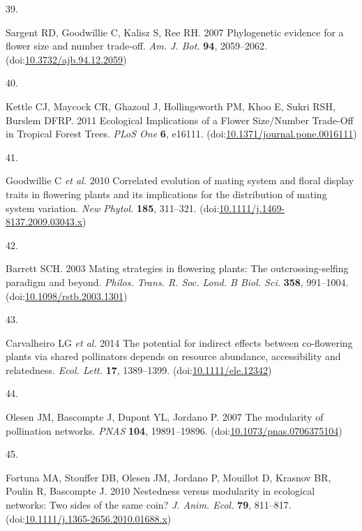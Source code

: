 \documentclass[
  12pt,
  a4paper,
]{article}
\newlength{\cslhangindent}
\newlength{\csllabelwidth}
\newlength{\cslentryspacingunit} %
\newenvironment{CSLReferences}[2] %
 {%
  \setlength{\parindent}{0pt}
  \ifodd #1
  \let\oldpar\par
  \def\par{\hangindent=\cslhangindent\oldpar}
  \fi
  \setlength{\parskip}{#2\cslentryspacingunit}
 }%
 {}
\newcommand{\CSLLeftMargin}[1]{\parbox[t]{\csllabelwidth}{#1}}
\newcommand{\CSLRightInline}[1]{\parbox[t]{\linewidth - \csllabelwidth}{#1}\break}
\begin{document}
\begin{CSLReferences}{0}{0}
\leavevmode{}%
\CSLLeftMargin{39. }
\CSLRightInline{Sargent RD, Goodwillie C, Kalisz S, Ree RH. 2007 Phylogenetic evidence for a flower size and number trade-off. \emph{Am. J. Bot.} \textbf{94}, 2059--2062. (doi:\href{https://doi.org/10.3732/ajb.94.12.2059}{10.3732/ajb.94.12.2059})}

\leavevmode{}%
\CSLLeftMargin{40. }
\CSLRightInline{Kettle CJ, Maycock CR, Ghazoul J, Hollingsworth PM, Khoo E, Sukri RSH, Burslem DFRP. 2011 Ecological {Implications} of a {Flower Size}/{Number Trade}-{Off} in {Tropical Forest Trees}. \emph{PLoS One} \textbf{6}, e16111. (doi:\href{https://doi.org/10.1371/journal.pone.0016111}{10.1371/journal.pone.0016111})}

\leavevmode{}%
\CSLLeftMargin{41. }
\CSLRightInline{Goodwillie C \emph{et al.} 2010 Correlated evolution of mating system and floral display traits in flowering plants and its implications for the distribution of mating system variation. \emph{New Phytol.} \textbf{185}, 311--321. (doi:\href{https://doi.org/10.1111/j.1469-8137.2009.03043.x}{10.1111/j.1469-8137.2009.03043.x})}

\leavevmode{}%
\CSLLeftMargin{42. }
\CSLRightInline{Barrett SCH. 2003 Mating strategies in flowering plants: The outcrossing-selfing paradigm and beyond. \emph{Philos. Trans. R. Soc. Lond. B Biol. Sci.} \textbf{358}, 991--1004. (doi:\href{https://doi.org/10.1098/rstb.2003.1301}{10.1098/rstb.2003.1301})}

\leavevmode{}%
\CSLLeftMargin{43. }
\CSLRightInline{Carvalheiro LG \emph{et al.} 2014 The potential for indirect effects between co-flowering plants via shared pollinators depends on resource abundance, accessibility and relatedness. \emph{Ecol. Lett.} \textbf{17}, 1389--1399. (doi:\href{https://doi.org/10.1111/ele.12342}{10.1111/ele.12342})}

\leavevmode{}%
\CSLLeftMargin{44. }
\CSLRightInline{Olesen JM, Bascompte J, Dupont YL, Jordano P. 2007 The modularity of pollination networks. \emph{PNAS} \textbf{104}, 19891--19896. (doi:\href{https://doi.org/10.1073/pnas.0706375104}{10.1073/pnas.0706375104})}

\leavevmode{}%
\CSLLeftMargin{45. }
\CSLRightInline{Fortuna MA, Stouffer DB, Olesen JM, Jordano P, Mouillot D, Krasnov BR, Poulin R, Bascompte J. 2010 Nestedness versus modularity in ecological networks: Two sides of the same coin? \emph{J. Anim. Ecol.} \textbf{79}, 811--817. (doi:\href{https://doi.org/10.1111/j.1365-2656.2010.01688.x}{10.1111/j.1365-2656.2010.01688.x})}


\end{CSLReferences}
\end{document}
